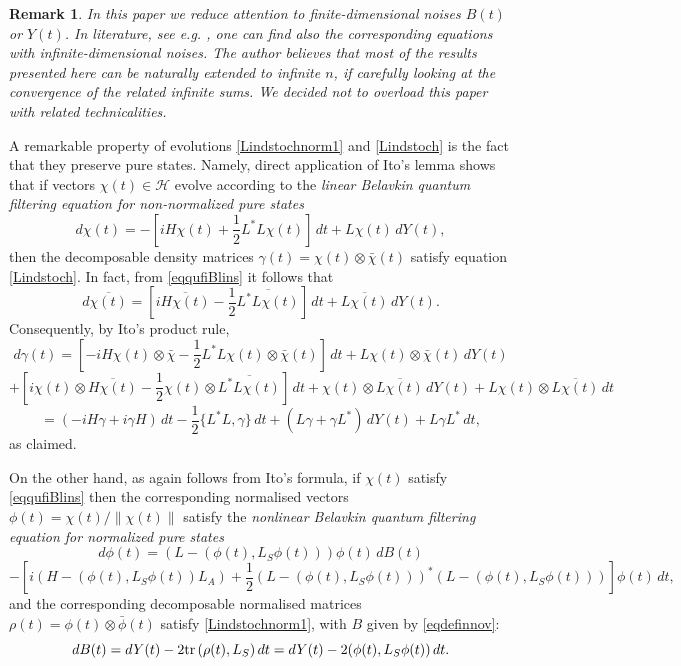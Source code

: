 \documentclass[12pt]{article}
\def\HC{\mathcal{H}}
\def\tr{\rm{tr}}
\def\ga{\gamma}
\newtheorem{remark}{Remark}
\begin{document}
\begin{remark}
In this paper we reduce attention to finite-dimensional noises $B(t)$ or $Y(t)$.
In literature, see e.g. \cite{MoraRebo}, one can find also the corresponding equations
with infinite-dimensional noises. The author believes that most of the results presented
here can be naturally extended to infinite $n$, if carefully looking at the convergence
of the related infinite sums. We decided not to overload this paper
with related technicalities.
\end{remark}

A remarkable property of evolutions \eqref{Lindstochnorm1} and  \eqref{Lindstoch} is the fact that
they preserve pure states. Namely, direct application of Ito's lemma shows that if vectors
 $\chi(t)\in \HC$ evolve according to the {\it linear Belavkin quantum filtering equation
 for non-normalized pure states}
\begin{equation}
\label{eqqufiBlins}
d\chi(t) =-[iH\chi(t) +\frac12 L^*L \chi(t) ]\,dt+L\chi(t) \, dY(t),
\end{equation}
then the decomposable density matrices $\ga(t)=\chi(t)\otimes \bar \chi(t)$
satisfy equation \eqref{Lindstoch}. In fact, from \eqref{eqqufiBlins} it follows that
\[
d\overline{\chi(t)} =[i \overline{H\chi(t)} -\frac12 \overline{L^*L \chi(t)} ]\,dt+\overline{L\chi(t)}\, dY(t).
\]
Consequently, by Ito's product rule,
\[
d\ga(t)=[-iH\chi(t)\otimes \bar \chi -\frac12 L^*L \chi(t)\otimes \bar \chi (t)]\,dt+L\chi(t)\otimes \bar \chi(t) \, dY(t)
\]
\[
+[i \chi(t)\otimes \overline{H\chi(t)} -\frac12 \chi(t) \otimes \overline{L^*L \chi(t)} ]\,dt
+\chi(t)\otimes \overline{L\chi(t)}\, dY(t)+L\chi(t) \otimes \overline{L\chi(t)} \, dt
\]
\[
=(-iH\ga+i\ga H)\, dt -\frac12 \{L^*L,\ga\} \, dt +(L\ga+\ga L^*) \, dY(t)+L\ga L^* \, dt,
\]
as claimed.

On the other hand, as again follows from Ito's formula,
if $\chi(t)$ satisfy \eqref{eqqufiBlins}
then the corresponding normalised vectors $\phi(t)=\chi(t)/\|\chi(t)\|$ satisfy
the {\it nonlinear Belavkin quantum filtering equation for normalized pure states}
\[
d\phi(t)=(L-(\phi(t), L_S \phi(t)))\phi(t) \, dB(t)
\]
\begin{equation}
\label{eqqufiBnonlins}
-[i(H-(\phi(t), L_S \phi(t)) L_A)
+\frac12 (L-(\phi(t), L_S \phi(t)))^*(L-(\phi(t), L_S \phi(t)))]\phi(t) \, dt,
\end{equation}
and the corresponding decomposable normalised
matrices $\rho(t) =\phi(t)\otimes \bar \phi(t)$ satisfy \eqref{Lindstochnorm1},
with $B$ given by \eqref{eqdefinnov}:
\[
dB(t)=dY(t)-2{\tr} \, (\rho(t), L_S) \, dt=dY(t)-2(\phi(t), L_S \phi(t))\, dt.
\]
\end{document}
